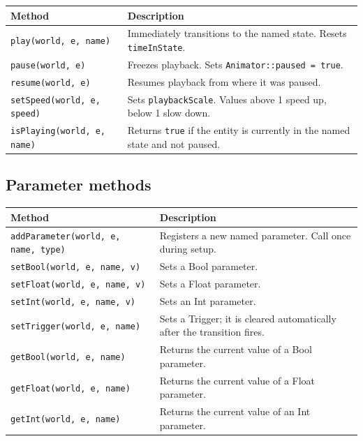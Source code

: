 \begin{longtable}{lp{10cm}}
\toprule
\textbf{Method} & \textbf{Description} \\
\midrule
\texttt{play(world, e, name)}      & Immediately transitions to the named state. Resets \texttt{timeInState}. \\
\texttt{pause(world, e)}           & Freezes playback. Sets \texttt{Animator::paused = true}. \\
\texttt{resume(world, e)}          & Resumes playback from where it was paused. \\
\texttt{setSpeed(world, e, speed)} & Sets \texttt{playbackScale}. Values above 1 speed up, below 1 slow down. \\
\texttt{isPlaying(world, e, name)} & Returns \texttt{true} if the entity is currently in the named state and not paused. \\
\bottomrule
\end{longtable}

\subsection{Parameter methods}

\begin{longtable}{lp{9.5cm}}
\toprule
\textbf{Method} & \textbf{Description} \\
\midrule
\texttt{addParameter(world, e, name, type)} & Registers a new named parameter. Call once during setup. \\
\texttt{setBool(world, e, name, v)}         & Sets a Bool parameter. \\
\texttt{setFloat(world, e, name, v)}        & Sets a Float parameter. \\
\texttt{setInt(world, e, name, v)}          & Sets an Int parameter. \\
\texttt{setTrigger(world, e, name)}         & Sets a Trigger; it is cleared automatically after the transition fires. \\
\texttt{getBool(world, e, name)}            & Returns the current value of a Bool parameter. \\
\texttt{getFloat(world, e, name)}           & Returns the current value of a Float parameter. \\
\texttt{getInt(world, e, name)}             & Returns the current value of an Int parameter. \\
\bottomrule
\end{longtable}

